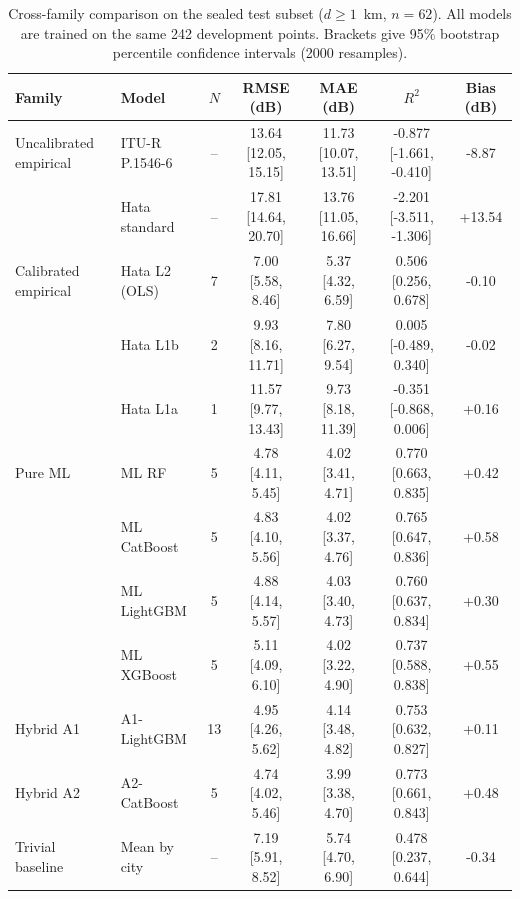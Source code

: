 \begin{table}[!t]
\centering
\caption{Cross-family comparison on the sealed test subset ($d \geq 1$~km, $n=62$). All models are trained on the same 242 development points. Brackets give 95\% bootstrap percentile confidence intervals (2000 resamples).}
\label{tab:cross_family}
\begin{tabular}{llccccc}
\toprule
Family & Model & $N$ & RMSE (dB) & MAE (dB) & $R^2$ & Bias (dB) \\
\midrule
Uncalibrated empirical & ITU-R P.1546-6 & -- & 13.64 [12.05, 15.15] & 11.73 [10.07, 13.51] & -0.877 [-1.661, -0.410] & -8.87 \\
 & Hata standard & -- & 17.81 [14.64, 20.70] & 13.76 [11.05, 16.66] & -2.201 [-3.511, -1.306] & +13.54 \\
\midrule
Calibrated empirical & Hata L2 (OLS) & 7 & 7.00 [5.58, 8.46] & 5.37 [4.32, 6.59] & 0.506 [0.256, 0.678] & -0.10 \\
 & Hata L1b & 2 & 9.93 [8.16, 11.71] & 7.80 [6.27, 9.54] & 0.005 [-0.489, 0.340] & -0.02 \\
 & Hata L1a & 1 & 11.57 [9.77, 13.43] & 9.73 [8.18, 11.39] & -0.351 [-0.868, 0.006] & +0.16 \\
\midrule
Pure ML & ML RF & 5 & 4.78 [4.11, 5.45] & 4.02 [3.41, 4.71] & 0.770 [0.663, 0.835] & +0.42 \\
 & ML CatBoost & 5 & 4.83 [4.10, 5.56] & 4.02 [3.37, 4.76] & 0.765 [0.647, 0.836] & +0.58 \\
 & ML LightGBM & 5 & 4.88 [4.14, 5.57] & 4.03 [3.40, 4.73] & 0.760 [0.637, 0.834] & +0.30 \\
 & ML XGBoost & 5 & 5.11 [4.09, 6.10] & 4.02 [3.22, 4.90] & 0.737 [0.588, 0.838] & +0.55 \\
\midrule
Hybrid A1 & A1-LightGBM & 13 & 4.95 [4.26, 5.62] & 4.14 [3.48, 4.82] & 0.753 [0.632, 0.827] & +0.11 \\
\midrule
Hybrid A2 & A2-CatBoost & 5 & 4.74 [4.02, 5.46] & 3.99 [3.38, 4.70] & 0.773 [0.661, 0.843] & +0.48 \\
\midrule
Trivial baseline & Mean by city & -- & 7.19 [5.91, 8.52] & 5.74 [4.70, 6.90] & 0.478 [0.237, 0.644] & -0.34 \\
\bottomrule
\end{tabular}
\end{table}